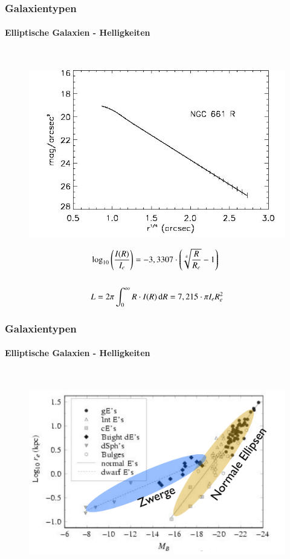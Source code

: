\begin{frame}
\frametitle{Galaxientypen}
\framesubtitle{Elliptische Galaxien - Helligkeiten}

\hfill \\

\begin{figure}
\includegraphics[scale=0.25]{Helligkeitsprofil_Ellipse.jpg}
\end{figure}


\begin{align*}
&\log_{10} \left( \frac{I(R)}{I_e} \right) = - 3,3307 \cdot \left( \sqrt[4]{\frac{R}{R_e}}  - 1 \right) \\
\hfill \\
&L = 2\pi \int_0^\infty R \cdot I(R) \d R = 7,215 \cdot \pi I_e R_e^2
\end{align*}

\end{frame}


\begin{frame}
\frametitle{Galaxientypen}
\framesubtitle{Elliptische Galaxien - Helligkeiten}

\hfill \\

\begin{figure}
\includegraphics[scale=0.25]{Helligkeitesverteilung_Ellipsen.png}
\end{figure}



\end{frame}




